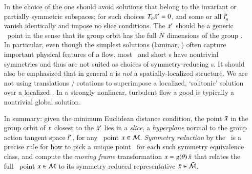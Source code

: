 \documentclass[preprint,12pt]{elsarticle} %
\begin{document}
In the choice of the {\template} one should avoid solutions
that belong to the invariant or partially symmetric subspaces; for such
choices $T_{a}\bar{x}'=0$, and some or all $\bar{t}{}'_{a}$ vanish identically
and impose no slice conditions. The {\template} $\bar{x}'$ should be a
generic \statesp\ point in the sense that its group orbit has the full
$N$ dimensions of the group \Group. In particular, even though the
simplest solutions (laminar, \etc) often capture important physical
features of a flow, most \eqva\ and short \po s have nontrivial
symmetries and thus are not suited as choices of symmetry-reducing
{\template s}.
It should also be emphasized that in general a {\template} is \emph{not}
a spatially-{localized} structure. We are not using translations /
rotations to superimpose a localized, `solitonic' solution over a
localized {\template}. In a strongly nonlinear, turbulent flow a good
{\template} is typically a nontrivial global solution.

In summary: given the minimum Euclidean distance condition, the
point $\bar{x}$ in the group orbit of $x$ closest
to the {\template} $\bar{x}'$ lies in a \emph{slice}, a {\em hyperplane}
normal to the group action tangent space $\bar{t}{}'_{}$, for any \statesp\
point $x \in {\cal M}$. {\em Symmetry reduction} by the \mframes\ is a
precise rule for how to pick a unique point \sspRed\ for each such
symmetry equivalence class, and compute the \emph{moving frame}
transformation $x =g({\bf \theta})\, \bar{x}$ that relates the full
\statesp\ point  $x \in {\cal M}$ to its symmetry reduced representative
$\bar{x} \in \bar{\cal M}$.
\end{document}
